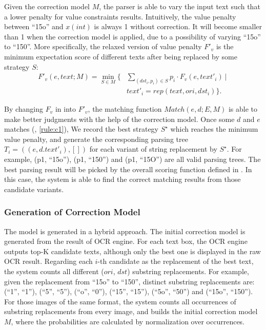 Given the correction model $M$,
the parser is able to vary the input text
such that a lower penalty for value constraints results.
Intuitively, the value penalty between ``15o'' and $x(int)$
is always 1 without correction.
It will become smaller than 1 when the correction model is applied,
due to a possibility of varying ``15o'' to ``150''.
More specifically, the relaxed version of value penalty $F'_v$
is the minimum expectation score of different texts
after being replaced by some strategy $S$:
\begin{equation}
\begin{aligned}
F'_v(e, text; M)=\min_{S \in M}\{ &
  \sum_{(dst_i, p_i) \in S} p_i \cdot F_v(e, text'_i)~ |~ \\
  & text'_i=rep(text, ori, dst_i)\}.
\end{aligned}
\end{equation}

By changing $F_v$ in  into $F'_v$,
the matching function $Match(e, d; E, M)$ is able to make better judgments
with the help of the correction model.
Once some $d$ and $e$ matches (, \ref{rule:c1}),
We record the best strategy $S^\star$ which reaches the minimum value penalty,
and generate the corresponding parsing tree $T_i = ((e, d.text'_i), [])$
for each variant of string replacement by $S^\star$.
For example, (p1, ``15o''), (p1, ``150'') and (p1, ``15O'')
are all valid parsing trees.
The best parsing result will be picked by the overall scoring function
defined in .
In this case, the system is able to find the correct matching results
from those candidate variants.


\subsubsection{Generation of Correction Model}
The model is generated in a hybrid approach.
The initial correction model is generated from the result of OCR engine.
For each text box, the OCR engine outputs top-K candidate texts, although
only the best one is displayed in the raw OCR result.
Regarding each $i$-th candidate as the replacement of the best text,
the system counts all different ($ori$, $dst$) substring replacements.
For example, given the replacement from ``15o'' to ``150'',
distinct substring replacements are:
(``1'', ``1''), (``5'', ``5''), (``o'', ``0''),
(``15'', ``15''), (``5o'', ``50'') and (``15o'', ``150'').
For those images of the same format,
the system counts all occurrences of substring replacements from every image,
and builds the initial correction model $M$,
where the probabilities are calculated by normalization over occurrences.

